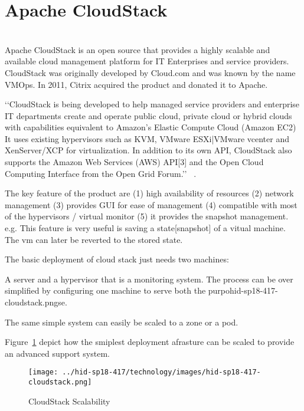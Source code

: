 
\section{Apache CloudStack}
\\

Apache CloudStack is an open source that provides a highly scalable and available 
cloud management platform for IT
Enterprises and service providers. CloudStack was originally developed by 
Cloud.com and was known by the name VMOps. 
In 2011, Citrix acquired the product and donated it to Apache. 

‘‘CloudStack is being developed to help managed service providers and enterprise IT 
departments create and operate public cloud, private cloud or hybrid clouds
with capabilities equivalent to Amazon's Elastic Compute Cloud (Amazon EC2)
It uses existing hypervisors such as KVM, VMware ESXi|VMware vcenter and
XenServer/XCP for virtualization. In addition to its own API, CloudStack 
also supports the Amazon Web Services (AWS) API[3] and the Open Cloud 
Computing Interface from the Open Grid Forum.’’  
~\cite{ hid-sp18-417-wiki-cloudStack}. 

The key feature of the product are 
(1) high availability of resources
(2) network management
(3) provides GUI for ease of management
(4) compatible with most of the hypervisors / virtual monitor
(5) it provides the snapshot management. e.g. This feature is 
very useful is saving a state[snapshot] of a vitual machine. 
The vm can later be reverted to the stored state.  

 The basic deployment of cloud stack just needs two machines: 
 
 A server and a hypervisor that is a monitoring system. 
 The process can be over simplified by configuring one machine 
 to serve both the purpohid-sp18-417-cloudstack.pngse. 
 
 The same simple system can easily be scaled to a zone or a pod.

Figure~\ref{F:cloudstack-scalabuility} depict how the smiplest deployment afrasture can be scaled to provide an advanced support system.

\begin{figure}[htb]
  \texttt{[image: ../hid-sp18-417/technology/images/hid-sp18-417-cloudstack.png]}
  \caption{CloudStack Scalability ~\cite{hid-sp18-417-cloudstack-scaling}}
  \label{F:cloudstack-scalabuility}
\end{figure}

